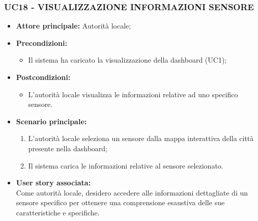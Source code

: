 \subsubsection{UC18 - VISUALIZZAZIONE INFORMAZIONI SENSORE}
\begin{itemize}
    \item \textbf{Attore principale:} Autorità locale;
    \item \textbf{Precondizioni:}
        \begin{itemize}
            \item Il sistema ha caricato la visualizzazione della dashboard (UC1);
        \end{itemize}
    \item \textbf{Postcondizioni:}
        \begin{itemize}
            \item L'autorità locale visualizza le informazioni relative ad uno specifico sensore.
        \end{itemize}
    \item \textbf{Scenario principale:}
        \begin{enumerate}
            \item L'autorità locale seleziona un sensore dalla mappa interattiva della città presente nella dashboard;
            \item Il sistema carica le informazioni relative al sensore selezionato.
        \end{enumerate}
    \item \textbf{User story associata:} \\
        Come autorità locale, desidero accedere alle informazioni dettagliate di un sensore specifico per ottenere una comprensione esaustiva delle sue caratteristiche e specifiche.
\end{itemize}